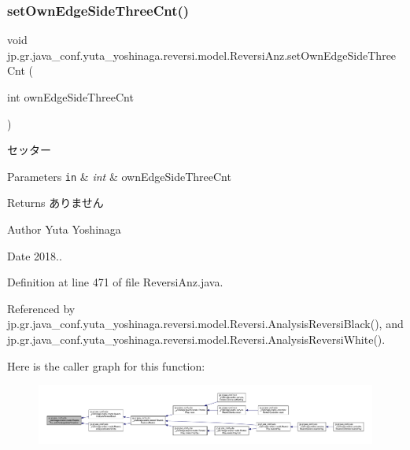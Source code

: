 \subsubsection{\texorpdfstring{set\+Own\+Edge\+Side\+Three\+Cnt()}{setOwnEdgeSideThreeCnt()}}
{\footnotesize\ttfamily void jp.\+gr.\+java\+\_\+conf.\+yuta\+\_\+yoshinaga.\+reversi.\+model.\+Reversi\+Anz.\+set\+Own\+Edge\+Side\+Three\+Cnt (\begin{DoxyParamCaption}\item[{int}]{own\+Edge\+Side\+Three\+Cnt }\end{DoxyParamCaption})}



セッター 


\begin{DoxyParams}[1]{Parameters}
\mbox{\tt in}  & {\em int} & own\+Edge\+Side\+Three\+Cnt \\
\hline
\end{DoxyParams}
\begin{DoxyReturn}{Returns}
ありません 
\end{DoxyReturn}
\begin{DoxyAuthor}{Author}
Yuta Yoshinaga 
\end{DoxyAuthor}
\begin{DoxyDate}{Date}
2018.. 
\end{DoxyDate}


Definition at line 471 of file Reversi\+Anz.\+java.



Referenced by jp.\+gr.\+java\+\_\+conf.\+yuta\+\_\+yoshinaga.\+reversi.\+model.\+Reversi.\+Analysis\+Reversi\+Black(), and jp.\+gr.\+java\+\_\+conf.\+yuta\+\_\+yoshinaga.\+reversi.\+model.\+Reversi.\+Analysis\+Reversi\+White().

Here is the caller graph for this function\+:
\nopagebreak
\begin{figure}[H]
\begin{center}
\leavevmode
\includegraphics[width=350pt]{classjp_1_1gr_1_1java__conf_1_1yuta__yoshinaga_1_1reversi_1_1model_1_1_reversi_anz_a0ce858afa1508c93ca52c33fa4eb2f32_icgraph}
\end{center}
\end{figure}
\mbox{\label{classjp_1_1gr_1_1java__conf_1_1yuta__yoshinaga_1_1reversi_1_1model_1_1_reversi_anz_a2275456b67f846c90e37b8e726b46aa6}} 
